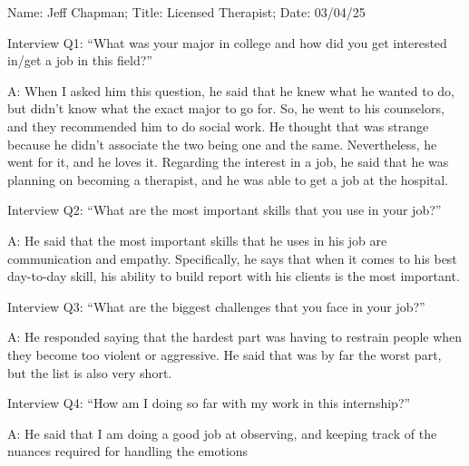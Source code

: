 Name: Jeff Chapman; Title: Licensed Therapist; Date: 03/04/25

Interview Q1: ``What was your major in college and how did you get interested in/get a job in this field?''

A: When I asked him this question, he said that he knew what he wanted to do, but didn't know what the exact major to go for. So, he went to his counselors, and they recommended him to do social work. He thought that was strange because he didn't associate the two being one and the same. Nevertheless, he went for it, and he loves it. 
Regarding the interest in a job, he said that he was planning on becoming a therapist, and he was able to get a job at the hospital.  

Interview Q2: ``What are the most important skills that you use in your job?''

A: He said that the most important skills that he uses in his job are communication and empathy. Specifically, he says that when it comes to his best day-to-day skill, his ability to build report with his clients is the most important. 

Interview Q3: ``What are the biggest challenges that you face in your job?''

A: He responded saying that the hardest part was having to restrain people when they become too violent or aggressive. He said that was by far the worst part, but the list is also very short. 

Interview Q4: ``How am I doing so far with my work in this internship?''

A: He said that I am doing a good job at observing, and keeping track of the nuances required for handling the emotions 
